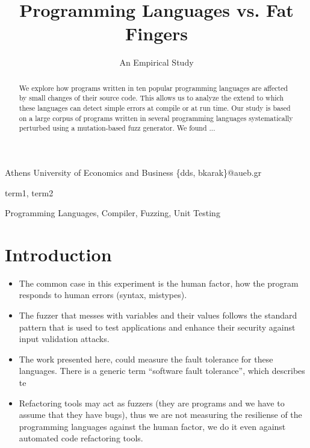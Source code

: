 \documentclass[10pt]{sigplanconf}
\begin{document}
\copyrightdata{[to be supplied]}


\title{Programming Languages vs. Fat Fingers}
\subtitle{An Empirical Study}

      {Athens University of Economics and Business}
      {\{dds, bkarak\}@aueb.gr}

\maketitle

\begin{abstract}
We explore how programs written in ten popular programming languages
are affected by small changes of their source code.
This allows us to analyze the extend to which these languages
can detect simple errors at compile or at run time.
Our study is based on a large corpus of programs written in several programming
languages systematically perturbed using a mutation-based fuzz generator.
We found ... %
\end{abstract}


\terms
term1, term2

\keywords
Programming Languages, Compiler, Fuzzing, Unit Testing

\section{Introduction} %

\cite{C99}

\begin{itemize}
	\item The common case in this experiment is the human factor, how the program responds to human errors (syntax, mistypes).
	\item The fuzzer that messes with variables and their values follows the standard pattern that is used to test applications and enhance their security against input validation attacks.
	\item The work presented here, could measure the fault tolerance for these languages. There is a generic term ``software fault tolerance'', which describes te
	\item Refactoring tools may act as fuzzers (they are programs and we have to assume that they have bugs), thus we are not measuring the resiliense of the programming languages against the human factor, we do it even against automated code refactoring tools.
\end{itemize}
\end{document}
